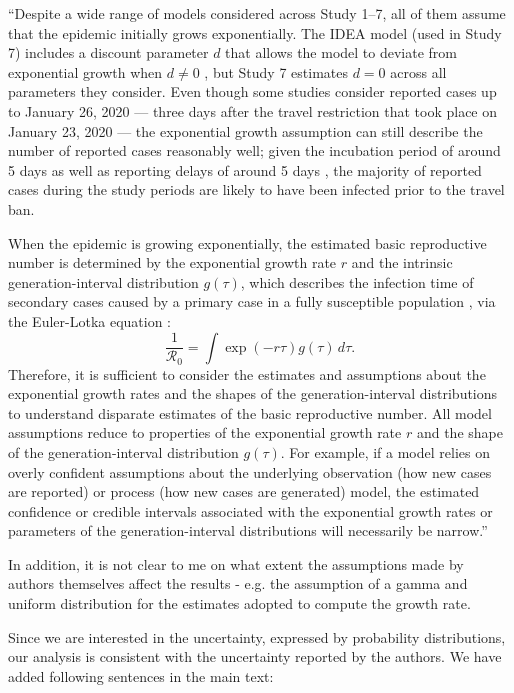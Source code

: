 \documentclass[12pt]{article}
\newcommand{\Ro}{\ensuremath{{\mathcal R}_{0}}\xspace}
\newcommand{\revtext}{\textsf}
\begin{document}
``Despite a wide range of models considered across Study 1--7, all of them assume that the epidemic initially grows exponentially.
The IDEA model (used in Study 7) includes a discount parameter $d$ that allows the model to deviate from exponential growth when $d \neq 0$ \citep{fisman2013idea}, but Study 7 estimates $d=0$ across all parameters they consider.
Even though some studies consider reported cases up to January 26, 2020 --- three days after the travel restriction that took place on January 23, 2020 \citep{Tianeabb6105} --- the exponential growth assumption can still describe the number of reported cases reasonably well;
given the incubation period of around 5 days \citep{lauer2020incubation} as well as reporting delays of around 5 days \citep{sun2020early}, the majority of reported cases during the study periods are likely to have been infected prior to the travel ban.

When the epidemic is growing exponentially, the estimated basic reproductive number is determined by the exponential growth rate $r$ and the intrinsic generation-interval distribution $g(\tau)$, which describes the infection time of secondary cases caused by a primary case in a fully susceptible population \citep{champredon2015intrinsic}, via the Euler-Lotka equation \citep{wallinga2007generation}:
\begin{equation}
\frac{1}{\Ro} = \int \exp(-r\tau) g(\tau) \, d\tau.
\label{eq:euler}
\end{equation}
Therefore, it is sufficient to consider the estimates and assumptions about the exponential growth rates and the shapes of the generation-interval distributions to understand disparate estimates of the basic reproductive number.
All model assumptions reduce to properties of the exponential growth rate $r$ and the shape of the generation-interval distribution $g(\tau)$.
For example, if a model relies on overly confident assumptions about the underlying observation (how new cases are reported) or process (how new cases are generated) model, the estimated confidence or credible intervals associated with the exponential growth rates or parameters of the generation-interval distributions will necessarily be narrow.''

\revtext{In addition, it is not clear to me on what extent the assumptions made by authors themselves affect the results - e.g. the assumption of a gamma and uniform distribution for the estimates adopted to compute the growth rate.}

Since we are interested in the uncertainty, expressed by probability distributions, our analysis is consistent with the uncertainty reported by the authors. We have added following sentences in the main text:
\end{document}
